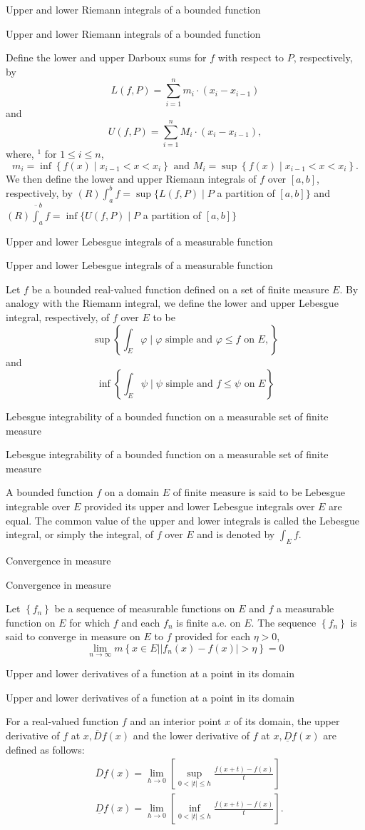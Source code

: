 \documentclass[17pt]{extarticle}
\renewcommand{\bar}[1]{\overline{#1}}
\newcommand{\boxset}[2]{\begin{mdframed}[style=darkQuesion]
#1
\end{mdframed}
\newpage
\begin{mdframed}[style=darkQuesion]
#1
  \end{mdframed}
\begin{mdframed}[style=darkAnswer]
#2
  \end{mdframed}
  \newpage
}
\begin{document}
\boxset{Upper and lower Riemann integrals of a bounded function}
{
Define the lower and upper Darboux sums for $f$ with respect to $P$, respectively, by
\[
L(f, P)=\sum_{i=1}^{n} m_{i} \cdot\left(x_{i}-x_{i-1}\right)
\]
and
\[
U(f, P)=\sum_{i=1}^{n} M_{i} \cdot\left(x_{i}-x_{i-1}\right),
\]
where, ${ }^{1}$ for $1 \leq i \leq n$,
\[
m_{i}=\inf \left\{f(x) \mid x_{i-1}<x<x_{i}\right\} \text { and } M_{i}=\sup \left\{f(x) \mid x_{i-1}<x<x_{i}\right\} .
\]
We then define the lower and upper Riemann integrals of $f$ over $[a, b]$, respectively, by
$(R) \int_{a}^{b} f=\sup \{L(f, P) \mid P$ a partition of $[a, b]\}$
and
$(R) \bar{\int}_{a}^{b} f=\inf \{U(f, P) \mid P$ a partition of $[a, b]\}$
}%
\boxset{Upper and lower Lebesgue integrals of a measurable function}
{
Let $f$ be a bounded real-valued function defined on a set of finite measure $E$. By analogy with the Riemann integral, we define the lower and upper Lebesgue integral, respectively, of $f$ over $E$ to be
\[
\sup \left\{\int_{E} \varphi \mid \varphi \text { simple and } \varphi \leq f \text { on } E,\right\}
\]
and
\[
\inf \left\{\int_{E} \psi \mid \psi \text { simple and } f \leq \psi \text { on } E\right\}
\]
}%
\boxset{Lebesgue integrability of a bounded function on a measurable set of finite measure}
{
A bounded function $f$ on a domain $E$ of finite measure is said to be Lebesgue integrable over $E$ provided its upper and lower Lebesgue integrals over $E$ are equal. The common value of the upper and lower integrals is called the Lebesgue integral, or simply the integral, of $f$ over $E$ and is denoted by $\int_{E} f$.
}%
\boxset{Convergence in measure}
{
Let $\left\{f_{n}\right\}$ be a sequence of measurable functions on $E$ and $f$ a measurable function on $E$ for which $f$ and each $f_{n}$ is finite a.e. on $E$. The sequence $\left\{f_{n}\right\}$ is said to converge in measure on $E$ to $f$ provided for each $\eta>0$,
\[
\lim _{n \rightarrow \infty} m\left\{x \in E|| f_{n}(x)-f(x) \mid>\eta\right\}=0
\]
}%
\boxset{Upper and lower derivatives of a function at a point in its domain}
{
For a real-valued function $f$ and an interior point $x$ of its domain, the upper derivative of $f$ at $x, \bar{D} f(x)$ and the lower derivative of $f$ at $x, \underline{D} f(x)$ are defined as follows:
\[
\begin{aligned}
&\bar{D} f(x)=\lim _{h \rightarrow 0}\left[\sup _{0<|t| \leq h} \frac{f(x+t)-f(x)}{t}\right] \\
&\underline{D} f(x)=\lim _{h \rightarrow 0}\left[\inf _{0<|t| \leq h} \frac{f(x+t)-f(x)}{t}\right] .
\end{aligned}
\]
}%
\end{document}
